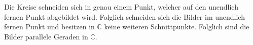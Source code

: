 \documentclass[11pt]{article}
\begin{document}
\begin{enumerate}
\begin{center}
		\end{center}
		Die Kreise schneiden sich in genau einem Punkt, welcher auf den unendlich fernen Punkt abgebildet wird. Folglich schneiden sich die Bilder im unendlich fernen Punkt und besitzen in $ \mathbb{C} $ keine weiteren Schnittpunkte. Folglich sind die Bilder parallele Geraden in $ \mathbb{C} $.
	\end{enumerate}
\end{document}
